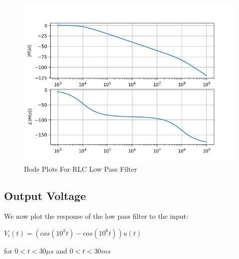 \documentclass{article}
\begin{document}
\begin{figure}[h!]
\includegraphics[scale=0.6]{Figure_4}
\centering
\caption{Bode Plots For RLC Low Pass Filter}
\label{fig:Coupled Oscillations}
\end{figure}

\clearpage

\subsection{Output Voltage}
We now plot the response of the low pass filter to the input:\newline
\begin{center}
$V_i(t) = (cos(10^3t) - cos(10^6t))u(t)$
\end{center}
for $0<t<30\mu s$ and $0<t<30ms$
\end{document}
